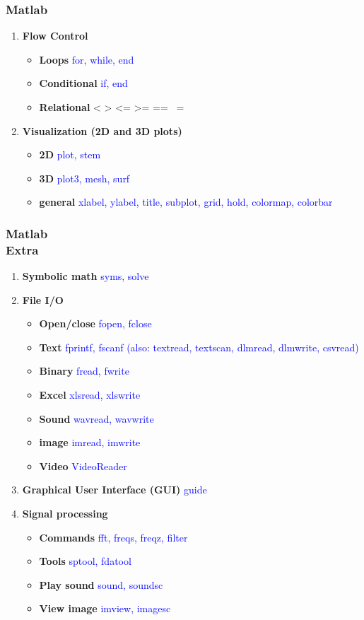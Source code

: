 \documentclass[hyperref={pdfpagelabels=true}]{beamer}
\begin{document}
\begin{frame}
\frametitle{Matlab}
\begin{enumerate}
\item {\bf Flow Control}
  \begin{itemize}
  \item {\bf Loops} \textcolor{blue}{for, while, end}
  \item {\bf Conditional}  \textcolor{blue}{if, end}
  \item {\bf Relational} < > <= >= == ~=
  \end{itemize}
\item {\bf Visualization (2D and 3D plots)}
  \begin{itemize}
  \item {\bf 2D} \textcolor{blue}{plot, stem}
  \item {\bf 3D}  \textcolor{blue}{plot3, mesh, surf}
  \item {\bf general} \textcolor{blue}{xlabel, ylabel, title, subplot, grid, hold, colormap, colorbar}
  \end{itemize}
\end{enumerate}
\end{frame}

\begin{frame}
\frametitle{Matlab \\ {\small Extra}}
\begin{enumerate}
\item {\bf Symbolic math} \textcolor{blue}{syms, solve}
\item {\bf File I/O}
  \begin{itemize}
  \item {\bf Open/close} \textcolor{blue}{fopen, fclose}
  \item {\bf Text}  \textcolor{blue}{fprintf, fscanf (also: textread, textscan, dlmread,
dlmwrite, csvread)}
  \item {\bf Binary} \textcolor{blue}{fread, fwrite}
  \item {\bf Excel} \textcolor{blue}{xlsread, xlswrite}
  \item {\bf Sound} \textcolor{blue}{wavread, wavwrite}
  \item {\bf image} \textcolor{blue}{imread, imwrite}
  \item {\bf Video} \textcolor{blue}{VideoReader}
  \end{itemize}
\item {\bf Graphical User Interface (GUI)} \textcolor{blue}{guide}
\item {\bf Signal processing}
  \begin{itemize}
  \item {\bf Commands} \textcolor{blue}{fft, freqs, freqz, filter}
  \item {\bf Tools}  \textcolor{blue}{sptool, fdatool}
  \item {\bf Play sound} \textcolor{blue}{sound, soundsc}
  \item {\bf View image} \textcolor{blue}{imview, imagesc}
  \end{itemize}
\end{enumerate}
\end{frame}
\end{document}
